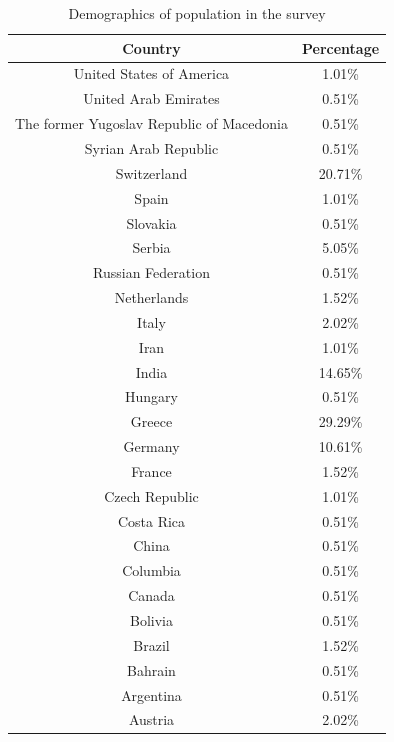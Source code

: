 \begin{table}[h!]
  \centering
  \caption{Demographics of population in the survey}
  \label{tab:demo}
  \begin{tabular}{cc}
    \toprule
     Country&Percentage\\
    \midrule
United States of America&1.01\%\\
United Arab Emirates&0.51\%\\
The former Yugoslav Republic of Macedonia&0.51\%\\
Syrian Arab Republic	&0.51\%\\
Switzerland&20.71\%\\
Spain	&1.01\%\\
Slovakia	&0.51\%\\
Serbia&	5.05\%\\
Russian Federation&	0.51\%\\
Netherlands	&1.52\%\\
Italy	&2.02\%\\
Iran&1.01\%\\
India	&14.65\%\\
Hungary	&0.51\%\\
Greece	&29.29\%\\
Germany	&10.61\%\\
France	&1.52\%\\
Czech Republic	&1.01\%\\
Costa Rica	&0.51\%\\
China	&0.51\%\\
Columbia	&0.51\%\\
Canada	&0.51\%\\
Bolivia	&0.51\%\\
Brazil	&1.52\%\\
Bahrain	&0.51\%\\
Argentina	&0.51\%\\
Austria & 2.02\%\\
    \bottomrule
  \end{tabular}
\end{table}


